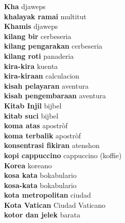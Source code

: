 \textbf{ Kha  } djaweps \\
\textbf{ khalayak ramai  } multitut \\
\textbf{ Khamis  } djaweps \\
\textbf{ kilang bir  } cerbeseria \\
\textbf{ kilang pengarakan  } cerbeseria \\
\textbf{ kilang roti  } panaderia \\
\textbf{ kira-kira  } kuenta \\
\textbf{ kira-kiraan  } calculacion \\
\textbf{ kisah pelayaran  } aventura \\
\textbf{ kisah pengembaraan  } aventura \\
\textbf{ Kitab Injil  } bijbel \\
\textbf{ kitab suci  } bijbel \\
\textbf{ koma atas  } apostròf \\
\textbf{ koma terbalik  } apostròf \\
\textbf{ konsentrasi fikiran  } atenshon \\
\textbf{ kopi cappuccino  } cappuccino (koffie) \\
\textbf{ Korea  } koreano \\
\textbf{ kosa kata  } bokabulario \\
\textbf{ kosa-kata  } bokabulario \\
\textbf{ kota metropolitan  } ciudad \\
\textbf{ Kota Vatican  } Ciudad Vaticano \\
\textbf{ kotor dan jelek  } barata \\
